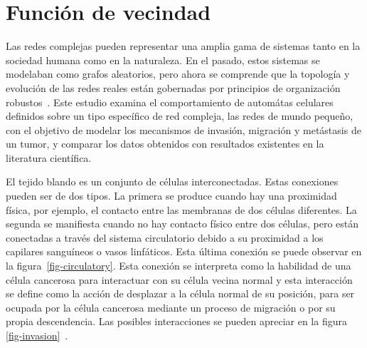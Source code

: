 \section{Funci\'on de vecindad}
\label{subsec-vec}

Las redes complejas pueden representar una amplia gama de sistemas tanto en la sociedad humana como en la naturaleza. En el pasado, estos sistemas se modelaban como grafos aleatorios, pero ahora se comprende que la topología y evolución de las redes reales están gobernadas por principios de organización robustos~\cite{complexnetworks}. Este estudio examina el comportamiento de automátas celulares definidos sobre un tipo específico de red compleja, las redes de mundo pequeño, con el objetivo de modelar los mecanismos de invasión, migración y metástasis de un tumor, y comparar los datos obtenidos con resultados existentes en la literatura científica.

El tejido blando es un conjunto de células interconectadas. Estas conexiones pueden ser de dos tipos. La primera se produce cuando hay una proximidad física, por ejemplo, el contacto entre las membranas de dos células diferentes. La segunda se manifiesta cuando no hay contacto físico entre dos células, pero están conectadas a través del sistema circulatorio debido a su proximidad a los capilares sanguíneos o vasos linfáticos. Esta última conexión se puede observar en la figura~\ref{fig-circulatory}. Esta conexión se interpreta como la habilidad de una célula cancerosa para interactuar con su célula vecina normal y esta interacción se define como la acción de desplazar a la célula normal de su posición, para ser ocupada por la célula cancerosa mediante un proceso de migración o por su propia descendencia. Las posibles interacciones se pueden apreciar en la figura \ref{fig-invasion}~\cite{kansal}.

